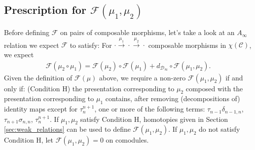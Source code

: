 \subsection{Prescription for $\mathcal{F}(\mu_1, \mu_2)$} \label{sec:F_of_mu_2}
Before defining $\mathcal{F}$ on pairs of 
composable morphisms, let's take a look 
at an $A_\infty$ relation we expect 
$\mathcal{F}$ to satisfy: For $\cdot 
\xrightarrow{\mu_1} \cdot 
\xrightarrow{\mu_2} \cdot$ 
composable morphisms in $\chi(\mathcal{C})$, 
we expect
\begin{align}
\label{eq:A_2}
\mathcal{F}(\mu_2\circ \mu_1) 
= 
\mathcal{F}(\mu_2) \circ \mathcal{F}(\mu_1) + 
d_{\mathcal{D}_\infty} \circ \mathcal{F}(\mu_1, \mu_2).
\end{align}
Given the definition of $\mathcal{F}(\mu)$ above, 
we require a non-zero $\mathcal{F}(\mu_1, \mu_2)$ 
if and only if: 
(Condition H) 
the presentation corresponding to 
$\mu_2$ composed with the presentation 
corresponding to $\mu_1$ contains, after 
removing (decompositions of) identity 
maps except for $\tau_{n}^{n+1}$, one 
or more of the following terms:
$\tau_{n-1} \delta_{n-1,n}$, 
$\tau_{n+1}\sigma_{n,n}$, 
$\tau_{n}^{n+1}$. If $\mu_1, \mu_2$ 
satisfy Condition H, homotopies given 
in Section \ref{sec:weak_relations} 
can be used to define $\mathcal{F}(\mu_1, \mu_2)$. 
If $\mu_1, \mu_2$ do not satisfy Condition 
H, let $\mathcal{F}(\mu_1, \mu_2) = 0$ 
on comodules.

